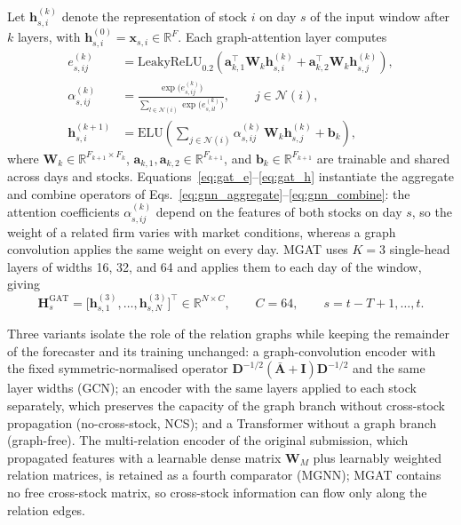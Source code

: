 {Let $\mathbf{h}^{(k)}_{s,i}$ denote the representation of stock $i$ on day $s$ of the input window after $k$ layers, with $\mathbf{h}^{(0)}_{s,i}=\mathbf{x}_{s,i}\in\mathbb{R}^{F}$. Each graph-attention layer computes
\begin{align}
e^{(k)}_{s,ij}&=\mathrm{LeakyReLU}_{0.2}\!\left(\mathbf{a}_{k,1}^{\top}\mathbf{W}_k\mathbf{h}^{(k)}_{s,i}+\mathbf{a}_{k,2}^{\top}\mathbf{W}_k\mathbf{h}^{(k)}_{s,j}\right),\label{eq:gat_e}\\
\alpha^{(k)}_{s,ij}&=\frac{\exp\big(e^{(k)}_{s,ij}\big)}{\sum_{l\in\mathcal{N}(i)}\exp\big(e^{(k)}_{s,il}\big)},\qquad j\in\mathcal{N}(i),\label{eq:gat_alpha}\\
\mathbf{h}^{(k+1)}_{s,i}&=\mathrm{ELU}\!\left(\sum_{j\in\mathcal{N}(i)}\alpha^{(k)}_{s,ij}\,\mathbf{W}_k\mathbf{h}^{(k)}_{s,j}+\mathbf{b}_k\right),\label{eq:gat_h}
\end{align}
where $\mathbf{W}_k\in\mathbb{R}^{F_{k+1}\times F_k}$, $\mathbf{a}_{k,1},\mathbf{a}_{k,2}\in\mathbb{R}^{F_{k+1}}$, and $\mathbf{b}_k\in\mathbb{R}^{F_{k+1}}$ are trainable and shared across days and stocks. Equations~\eqref{eq:gat_e}--\eqref{eq:gat_h} instantiate the aggregate and combine operators of Eqs.~\eqref{eq:gnn_aggregate}--\eqref{eq:gnn_combine}: the attention coefficients $\alpha^{(k)}_{s,ij}$ depend on the features of both stocks on day $s$, so the weight of a related firm varies with market conditions, whereas a graph convolution applies the same weight on every day. MGAT uses $K=3$ single-head layers of widths 16, 32, and 64 and applies them to each day of the window, giving
\[
\mathbf{H}^{\mathrm{GAT}}_{s}=\big[\mathbf{h}^{(3)}_{s,1},\ldots,\mathbf{h}^{(3)}_{s,N}\big]^{\top}\in\mathbb{R}^{N\times C},\qquad C=64,\qquad s=t-T+1,\ldots,t .
\]

Three variants isolate the role of the relation graphs while keeping the remainder of the forecaster and its training unchanged: a graph-convolution encoder with the fixed symmetric-normalised operator $\mathbf{D}^{-1/2}(\bar{\mathbf{A}}+\mathbf{I})\mathbf{D}^{-1/2}$ and the same layer widths (GCN); an encoder with the same layers applied to each stock separately, which preserves the capacity of the graph branch without cross-stock propagation (no-cross-stock, NCS); and a Transformer without a graph branch (graph-free). The multi-relation encoder of the original submission, which propagated features with a learnable dense matrix $\mathbf{W}_M$ plus learnably weighted relation matrices, is retained as a fourth comparator (MGNN); MGAT contains no free cross-stock matrix, so cross-stock information can flow only along the relation edges.\par}
